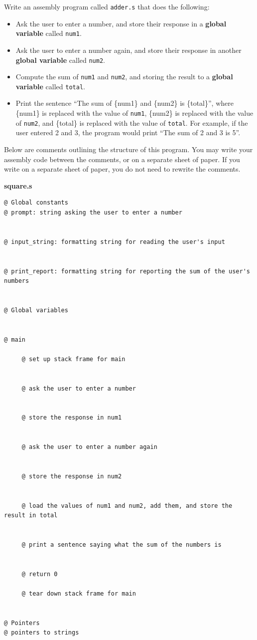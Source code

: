 \documentclass[12pt]{article}
\begin{document}
Write an assembly program called \texttt{adder.s} that does the following:
\begin{itemize}
\item Ask the user to enter a number, and store their response in a \textbf{global variable} called \texttt{num1}.
\item Ask the user to enter a number again, and store their response in another \textbf{global variable} called \texttt{num2}.
\item Compute the sum of \texttt{num1} and \texttt{num2}, and storing the result to a \textbf{global variable} called \texttt{total}.
\item Print the sentence ``The sum of \{num1\} and \{num2\} is \{total\}'', where \{num1\} is replaced with the value of \texttt{num1}, \{num2\} is replaced with the value of \texttt{num2}, and \{total\} is replaced with the value of \texttt{total}. For example, if the user entered 2 and 3, the program would print ``The sum of 2 and 3 is 5''.
\end{itemize}
Below are comments outlining the structure of this program. You may write your assembly code between the comments, or on a separate sheet of paper. If you write on a separate sheet of paper, you do not need to rewrite the comments.

\textbf{square.s}

\begin{verbatim}
@ Global constants
@ prompt: string asking the user to enter a number


@ input_string: formatting string for reading the user's input


@ print_report: formatting string for reporting the sum of the user's numbers


@ Global variables


@ main

     @ set up stack frame for main

     
     @ ask the user to enter a number

     
     @ store the response in num1

     
     @ ask the user to enter a number again

     
     @ store the response in num2


     @ load the values of num1 and num2, add them, and store the result in total

     
     @ print a sentence saying what the sum of the numbers is

     
     @ return 0

     @ tear down stack frame for main


@ Pointers
@ pointers to strings

\end{verbatim}
\end{document}
